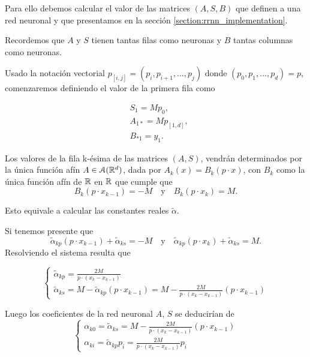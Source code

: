 \begin{aportacionOriginal}
Para ello debemos calcular el valor de las matrices $(A,S,B)$ que definen a una red neuronal y que presentamos en la sección \ref{section:rrnn_implementation}.

Recordemos que $A$ y $S$ tienen tantas filas como neuronas  y $B$ tantas columnas como neuronas. 

Usado la notación vectorial
$p_{[i,j]} = (p_i, p_{i+1}, \ldots, p_{j})$ donde $(p_0, p_1, \ldots, p_d)=p$, comenzaremos definiendo el valor de la primera fila como

\begin{align}
    &S_1 = M p_0, \\
    & A_{1 *} = M p_{[1,d]}, \\
    & B_{* 1} = y_1.
\end{align}

Los valores de la fila  k-ésima de las matrices $(A,S)$, vendrán determinados por la única función afín $A \in \mathcal{A}(\mathbb{R}^d)$, 
dada por $A_k(x)=B_k(p \cdot x)$, con $B_{k}$ como la única función afín de $\mathbb{R}$ en $\mathbb{R}$ que cumple que 
\begin{equation}
    B_k(p \cdot x_{k-1}) = -M 
    \quad \text{y} \quad 
     B_{k}(p \cdot x_k)= M.
\end{equation}

Esto equivale a calcular las constantes reales $\tilde {\alpha}$. 

Si tenemos presente que 
\begin{equation}
    \tilde{\alpha}_{k p} (p \cdot x_{k-1}) + \tilde{\alpha}_{k s} = -M 
    \quad \text{y} \quad 
    \tilde{\alpha}_{k p}(p \cdot x_k) + \tilde{\alpha}_{k s}= M.
\end{equation} 
Resolviendo el sistema resulta que 

\begin{equation}
    \left\{ 
        \begin{array}{l}
            \tilde{\alpha}_{k p} = \frac{2 M}{p \cdot (x_k - x_{k-1})}
            \\
            \tilde{\alpha}_{k s} 
            = M -  \tilde{\alpha}_{k p}(p \cdot x_{k-1})
            = M -  \frac{2 M}{p \cdot (x_k - x_{k-1})}(p \cdot x_{k-1}) 
        \end{array}
    \right.
\end{equation}

Luego los coeficientes de la red neuronal $A$, $S$ se deducirían de 
\begin{equation}
    \left\{ 
        \begin{array}{l}
            \alpha_{k 0} = \tilde{\alpha}_{k s} =
            M -  \frac{2 M}{p \cdot (x_k - x_{k-1})}(p \cdot x_{k-1}) 
            \\
            \alpha_{k i} =  \tilde{\alpha}_{k p} p_{i}
            = 
            \frac{2 M}{p \cdot (x_k - x_{k-1})}
            p_i 
        \end{array}
        \right.
\end{equation}


\end{aportacionOriginal}
